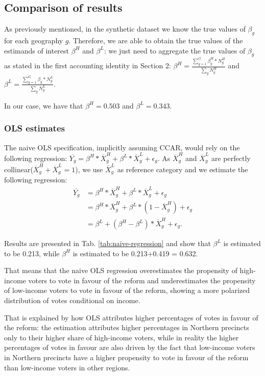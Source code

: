 \subsection{Comparison of results}

As previously mentioned, in the synthetic dataset we know the true values of $\beta_g$ for each geography $g$. Therefore, we are able to obtain the true values of the estimands of interest $\beta^H$ and $\beta^L$: we just need to aggregate the true values of $\beta_g$ as stated in the first accounting identity in Section 2: $\beta^H = \frac{\sum_{g=1}^G \beta^H_g*N^H_g}{\sum_g N^H_g}$ and $\beta^L = \frac{\sum_{g=1}^G \beta_g*N_g^L}{\sum_g N_g^L}$.

In our case, we have that $\beta^H = 0.503$ and $\beta^L = 0.343$.



\subsubsection{OLS estimates}

The naive OLS specification, implicitly assuming CCAR, would rely on the following regression: $\overline{Y_g} = \beta^H*\overline{X}_g^H + \beta^L*\overline{X}_g^L+\epsilon_g$.
As $\overline{X}_g^H$ and $\overline{X}_g^L$ are perfectly collinear($\overline{X}_g^H + \overline{X}_g^L = 1$), we use $\overline{X}_g^L$ as reference category and we estimate the following regression: 
\begin{align*}
\overline{Y_g} & = \beta^H*\overline{X}_g^H + \beta^L*\overline{X}_g^L+\epsilon_g 
\\& = \beta^H*\overline{X}_g^H + \beta^L*(1-\overline{X}_g^H)+\epsilon_g
\\& = \beta^L + (\beta^H - \beta^L)*\overline{X}_g^H + \epsilon_g.
\end{align*}

Results are presented in Tab. \ref{tab:naive-regression} and show that $\beta^L$ is estimated to be 0.213, while $\beta^H$ is estimated to be 0.213+0.419 = 0.632.



That means that the naive OLS regression overestimates the propensity of high-income voters to vote in favour of the reform and underestimates the propensity of low-income voters to vote in favour of the reform, showing a more polarized distribution of votes conditional on income. 

That is explained by how OLS attributes higher percentages of votes in favour of the reform: the estimation attributes higher percentages in Northern precincts only to their higher share of high-income voters, while in reality the higher percentages of votes in favour are also driven by the fact that low-income voters in Northern precincts have a higher propensity to vote in favour of the reform than low-income voters in other regions.

